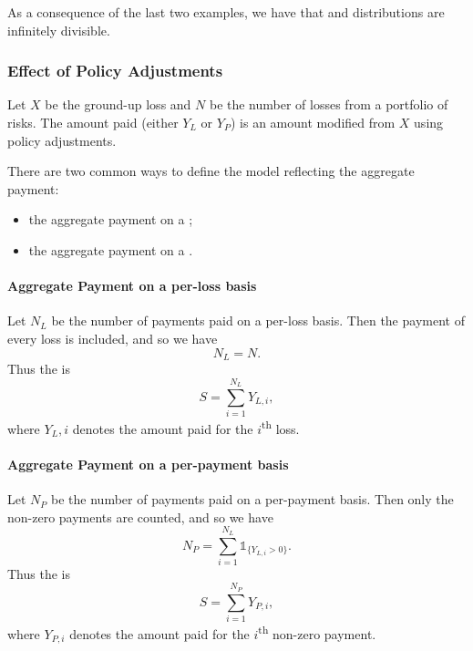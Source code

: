 \documentclass[notoc,notitlepage]{tufte-book}
\begin{document}
\begin{remark}
  As a consequence of the last two examples, we have that  and  distributions are infinitely divisible. 
\end{remark}


\subsubsection{Effect of Policy Adjustments}%
\label{ssub:effect_of_policy_adjustments}

Let $X$ be the ground-up loss and $N$ be the number of losses from a portfolio of risks. The amount paid (either $Y_L$ or $Y_P$) is an amount modified from $X$ using policy adjustments.

There are two common ways to define the model reflecting the aggregate payment:
\begin{itemize}
  \item the aggregate payment on a ;
  \item the aggregate payment on a .
\end{itemize}

\paragraph{Aggregate Payment on a per-loss basis} Let $N_L$ be the number of payments paid on a per-loss basis. Then the payment of every loss is included, and so we have
\begin{equation*}
  N_L = N.
\end{equation*}
Thus the  is
\begin{equation*}
  S = \sum_{i=1}^{N_L} Y_{L, i},
\end{equation*}
where $Y_L, i$ denotes the amount paid for the $i$\textsuperscript{th} loss.

\paragraph{Aggregate Payment on a per-payment basis} Let $N_P$ be the number of payments paid on a per-payment basis. Then only the non-zero payments are counted, and so we have
\begin{equation*}
  N_P = \sum_{i=1}^{N_L} \mathbb{1}_{\{Y_{L, i} > 0\}}.
\end{equation*}
Thus the  is
\begin{equation*}
  S = \sum_{i=1}^{N_P} Y_{P, i},
\end{equation*}
where $Y_{P, i}$ denotes the amount paid for the $i$\textsuperscript{th} non-zero payment.
\end{document}

